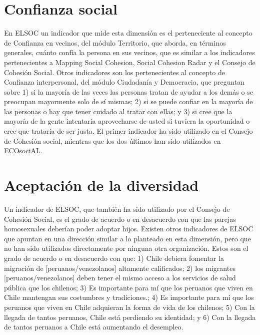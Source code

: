 \documentclass[
  12pt,
]{book}
\begin{document}
\hypertarget{confianza-social-1}{%
\section{Confianza social}\label{confianza-social-1}}

En ELSOC un indicador que mide esta dimensión es el perteneciente al concepto de Confianza en vecinos, del módulo Territorio, que aborda, en términos generales, cuánto confía la persona en sus vecinos, que es similar a los indicadores pertenecientes a Mapping Social Cohesion, Social Cohesion Radar y el Consejo de Cohesión Social. Otros indicadores son los pertenecientes al concepto de Confianza interpersonal, del módulo Ciudadanía y Democracia, que preguntan sobre 1) si la mayoría de las veces las personas tratan de ayudar a los demás o se preocupan mayormente solo de sí mismas; 2) si se puede confiar en la mayoría de las personas o hay que tener cuidado al tratar con ellas; y 3) si cree que la mayoría de la gente intentaría aprovecharse de usted si tuviera la oportunidad o cree que trataría de ser justa. El primer indicador ha sido utilizado en el Consejo de Cohesión social, mientras que los dos últimos han sido utilizados en
ECOsociAL.

\hypertarget{aceptaciuxf3n-de-la-diversidad-1}{%
\section{Aceptación de la diversidad}\label{aceptaciuxf3n-de-la-diversidad-1}}

Un indicador de ELSOC, que también ha sido utilizado por el Consejo de Cohesión Social, es el grado de acuerdo o en desacuerdo con que las parejas homosexuales deberían poder adoptar hijos. Existen otros indicadores de ELSOC que apuntan en una dirección similar a lo planteado en esta dimensión, pero que no han sido utilizados directamente por ninguna otra organización. Estos son el grado de acuerdo o en desacuerdo con que: 1) Chile debiera fomentar la migración de {[}peruanos/venezolanos{]} altamente calificados; 2) los migrantes {[}peruanos/venezolanos{]} deben tener el mismo acceso a los servicios de salud pública que los chilenos; 3) Es importante para mí que los peruanos que viven en Chile mantengan sus costumbres y tradiciones.; 4) Es importante para mí que los peruanos que viven en Chile adquieran la forma de vida de los chilenos; 5) Con la llegada de tantos peruanos, Chile está perdiendo su identidad; y 6) Con la llegada de tantos peruanos a Chile está aumentando el desempleo.
\end{document}

